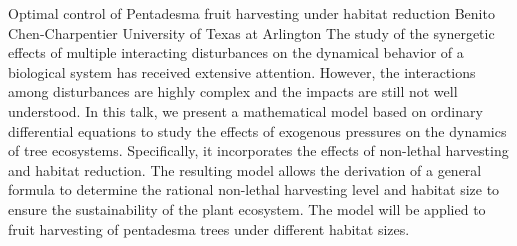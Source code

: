 \vspace{1.5ex}
\abs
{Optimal control of Pentadesma fruit harvesting under habitat reduction}
{Benito Chen-Charpentier}
{University of Texas at Arlington}
{The study of the synergetic effects of multiple interacting disturbances
on the dynamical behavior of a biological system has received extensive
attention.  However, the interactions among disturbances are highly
complex and the impacts are still not well understood. In this talk, 
we present a mathematical model based on ordinary differential 
equations to study the effects of exogenous pressures on the 
dynamics of tree ecosystems. Specifically, it incorporates 
the effects of non-lethal harvesting and habitat reduction. 
The resulting model allows the derivation of a general formula 
to determine the rational non-lethal harvesting level and 
habitat size to ensure the sustainability of the plant ecosystem. 
The model will be applied to fruit harvesting of pentadesma trees 
under different habitat sizes.}


